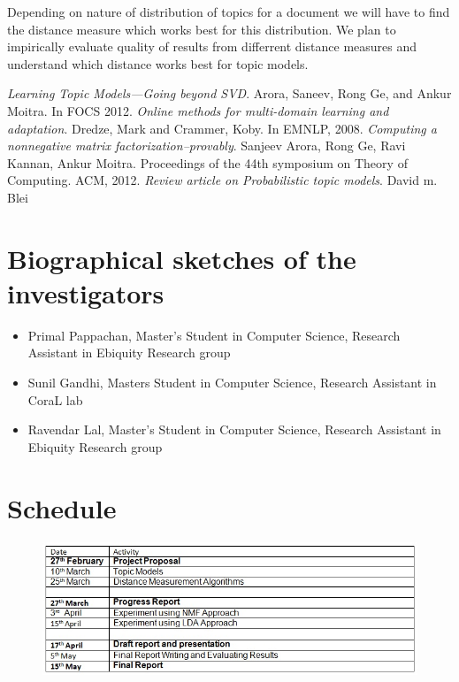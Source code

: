 \documentclass[a4paper,11pt]{article}
\begin{document}
{Depending on nature of distribution of topics for a document we will have to find the distance measure which works best for this distribution. We plan to impirically evaluate quality of results from differrent distance measures and understand which distance works best for topic models.


\begin{thebibliography}{99}
 \textit{Learning Topic Models---Going beyond SVD}. Arora, Saneev, Rong Ge, and Ankur Moitra. In FOCS 2012.
 \textit{Online methods for multi-domain learning and adaptation}. Dredze, Mark and Crammer, Koby. In
EMNLP, 2008.
 \textit{Computing a nonnegative matrix factorization--provably}. Sanjeev Arora, Rong Ge, Ravi Kannan, Ankur Moitra. Proceedings of the 44th symposium on Theory of Computing. ACM, 2012.  
 \textit{Review article on Probabilistic topic models}. David m. Blei  
\end{thebibliography}

\section{Biographical sketches of the investigators}

\begin{itemize}
\item Primal Pappachan, Master's Student in Computer Science, Research Assistant in Ebiquity Research group
\item Sunil Gandhi, Masters Student in Computer Science, Research Assistant in CoraL lab
\item Ravendar Lal, Master's Student in Computer Science, Research Assistant in Ebiquity Research group
\end{itemize}


\section{Schedule}
\begin{figure}[h]
\includegraphics[scale=0.75]{schedule.jpg}
\end{figure}


}
\end{document}
